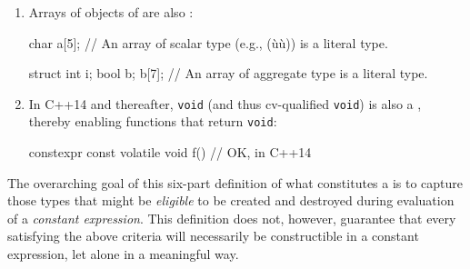 \begin{enumerate}
\item{Arrays of objects of  are also :

\begin{emcppslisting}
char a[5];  // An array of scalar type (e.g., (ù{}ù)) is a literal type.

struct { int i; bool b; } b[7];
    // An array of aggregate type is a literal type.
\end{emcppslisting}
}

\item{In C++14 and thereafter, \lstinline!void! (and thus cv-qualified \lstinline!void!) is also a , thereby enabling functions that return \lstinline!void!:

\begin{emcppslisting}[emcppsstandards={c++14}]
constexpr const volatile void f() { }  // OK, in C++14
\end{emcppslisting}
}
\end{enumerate}

The overarching goal of this six-part definition of what constitutes a
 is to capture those types that might be
\emph{eligible} to be created and destroyed during evaluation of a
\emph{constant expression}. This definition does not, however, guarantee
that every  satisfying the above criteria will
necessarily be constructible in a constant expression, let alone in a
meaningful way.

